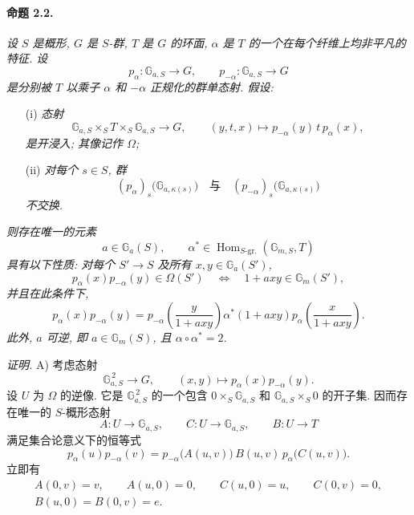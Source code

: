 \paragraph{\textbf{命题 2.2.}}
\emph{设 \(S\) 是概形, \(G\) 是 \(S\)-群, \(T\) 是 \(G\) 的环面, \(\alpha\) 是 \(T\) 的一个在每个纤维上均非平凡的特征. 设}
\[
  p_\alpha\colon\mathbb G_{a,S}\longrightarrow G,\qquad
  p_{-\alpha}\colon\mathbb G_{a,S}\longrightarrow G
\]
\emph{是分别被 \(T\) 以乘子 \(\alpha\) 和 \(-\alpha\) 正规化的群单态射. 假设:}
\begin{enumerate}
\item[\textup{(i)}] \emph{态射}
  \[
    \mathbb G_{a,S}\times_S T\times_S\mathbb G_{a,S}
      \longrightarrow G,
    \qquad
    (y,t,x)\longmapsto p_{-\alpha}(y)\,t\,p_\alpha(x),
  \]
  \emph{是开浸入; 其像记作 \(\Omega\);}
\item[\textup{\SGAInlineRefTarget{zh:sga3:xx:proposition:2.2:item:ii}(ii)}] \emph{对每个 \(s\in S\), 群}
  \[
    (p_\alpha)_s\bigl(\mathbb G_{a,\kappa(s)}\bigr)
    \quad\text{与}\quad
    (p_{-\alpha})_s\bigl(\mathbb G_{a,\kappa(s)}\bigr)
  \]
  \emph{不交换.}
\end{enumerate}
\emph{则存在唯一的元素}
\[
  a\in\mathbb G_a(S),\qquad
  \alpha^\ast\in
    \operatorname{Hom}_{S\text{-gr.}}(\mathbb G_{m,S},T)
\]
\emph{具有以下性质: 对每个 \(S'\to S\) 及所有 \(x,y\in\mathbb G_a(S')\),}
\[
  p_\alpha(x)p_{-\alpha}(y)\in\Omega(S')
  \quad\Longleftrightarrow\quad
  1+axy\in\mathbb G_m(S'),
\]
\emph{并且在此条件下,}
\[
  p_\alpha(x)p_{-\alpha}(y)
   =p_{-\alpha}\left(\frac{y}{1+axy}\right)
      \alpha^\ast(1+axy)
      p_\alpha\left(\frac{x}{1+axy}\right).
\]
\emph{此外, \(a\) 可逆, 即 \(a\in\mathbb G_m(S)\), 且 \(\alpha\circ\alpha^\ast=2\).}

\medskip
\noindent\emph{证明.}
\textup{A)} 考虑态射
\[
  \mathbb G_{a,S}^{\,2}\longrightarrow G,\qquad
  (x,y)\longmapsto p_\alpha(x)p_{-\alpha}(y).
\]
设 \(U\) 为 \(\Omega\) 的逆像. 它是 \(\mathbb G_{a,S}^{\,2}\) 的一个包含 \(0\times_S\mathbb G_{a,S}\) 和 \(\mathbb G_{a,S}\times_S0\) 的开子集. 因而存在唯一的 \(S\)-概形态射
\[
  A\colon U\longrightarrow\mathbb G_{a,S},\qquad
  C\colon U\longrightarrow\mathbb G_{a,S},\qquad
  B\colon U\longrightarrow T
\]
满足集合论意义下的恒等式
\[
  p_\alpha(u)p_{-\alpha}(v)
    =p_{-\alpha}\bigl(A(u,v)\bigr)\,
      B(u,v)\,p_\alpha\bigl(C(u,v)\bigr).
\]
立即有
\[
\begin{gathered}
  A(0,v)=v,\qquad A(u,0)=0,\qquad
  C(u,0)=u,\qquad C(0,v)=0,\\
  B(u,0)=B(0,v)=e.
\end{gathered}
\]

